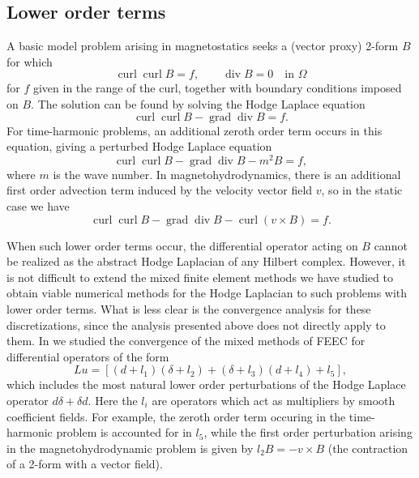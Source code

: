 \subsection{{Lower order terms}}\label{sec:lower-order-terms}

{A basic model problem arising in magnetostatics seeks a (vector proxy) 2-form $B$ for which}
\[
\operatorname{curl}\operatorname{curl}B=f,\qquad\operatorname{div}B=0\quad\text{in }\Omega
\]
{for $f$ given in the range of the curl, together with boundary conditions imposed on $B$. The solution can be found by solving the Hodge Laplace equation}
\[
\operatorname{curl}\operatorname{curl}B-\operatorname{grad}\operatorname{div}B=f.
\]
{For time-harmonic problems, an additional zeroth order term occurs in this equation, giving a perturbed Hodge Laplace equation}
\[
\operatorname{curl}\operatorname{curl}B-\operatorname{grad}\operatorname{div}B-m^2B=f,
\]
{where $m$ is the wave number. In magnetohydrodynamics, there is an additional first order advection term induced by the velocity vector field $v$, so in the static case we have}
\[
\operatorname{curl}\operatorname{curl}B-\operatorname{grad}\operatorname{div}B-\operatorname{curl}(v\times B)=f.
\]

{When such lower order terms occur, the differential operator acting on $B$ cannot be realized as the abstract Hodge Laplacian of any Hilbert complex. However, it is not difficult to extend the mixed finite element methods we have studied to obtain viable numerical methods for the Hodge Laplacian to such problems with lower order terms. What is less clear is the convergence analysis for these discretizations, since the analysis presented above does not directly apply to them. In  we studied the convergence of the mixed methods of FEEC for differential operators of the form}
\[
Lu=[(d+l_1)(\delta+l_2)+(\delta+l_3)(d+l_4)+l_5],
\]
{which includes the most natural lower order perturbations of the Hodge Laplace operator $d\delta+\delta d$. Here the $l_i$ are operators which act as multipliers by smooth coefficient fields. For example, the zeroth order term occuring in the time-harmonic problem is accounted for in $l_5$, while the first order perturbation arising in the magnetohydrodynamic problem is given by $l_2B=-v\times B$ (the contraction of a 2-form with a vector field).}

